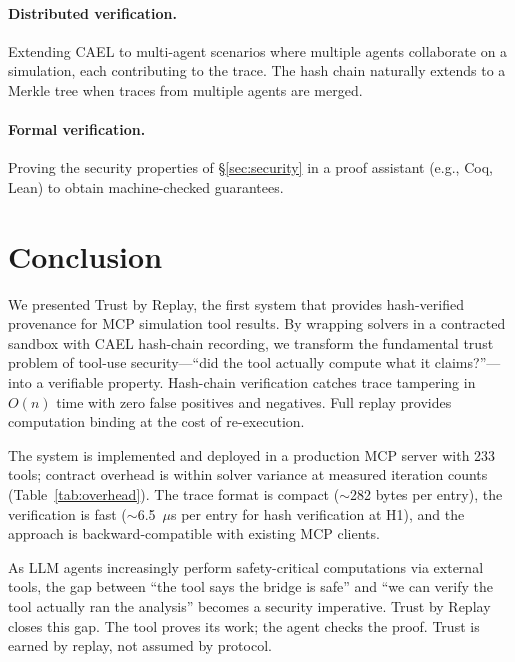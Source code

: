 \documentclass[letterpaper,twocolumn,10pt]{article}
\begin{document}
\paragraph{Distributed verification.} Extending CAEL to multi-agent
scenarios where multiple agents collaborate on a simulation, each contributing
to the trace. The hash chain naturally extends to a Merkle tree when traces
from multiple agents are merged.

\paragraph{Formal verification.} Proving the security properties of
\S\ref{sec:security} in a proof assistant (e.g., Coq, Lean) to obtain
machine-checked guarantees.


\section{Conclusion}
\label{sec:conclusion}

We presented Trust by Replay, the first system that provides hash-verified
provenance for MCP simulation tool results. By wrapping solvers in a
contracted sandbox with CAEL hash-chain recording, we transform the
fundamental trust problem of tool-use security---``did the tool actually
compute what it claims?''---into a verifiable property. Hash-chain
verification catches trace tampering in $O(n)$ time with zero false
positives and negatives. Full replay provides computation binding at the
cost of re-execution.

The system is implemented and deployed in a production MCP server with
233 tools; contract overhead is within solver variance at measured iteration counts (Table~\ref{tab:overhead}). The trace format
is compact ($\sim$282 bytes per entry), the verification is fast
($\sim$6.5~$\mu$s per entry for hash verification at H1), and the approach is
backward-compatible with existing MCP clients.

As LLM agents increasingly perform safety-critical computations via external
tools, the gap between ``the tool says the bridge is safe'' and ``we can
verify the tool actually ran the analysis'' becomes a security imperative.
Trust by Replay closes this gap. The tool proves its work; the agent checks
the proof. Trust is earned by replay, not assumed by protocol.
\end{document}
